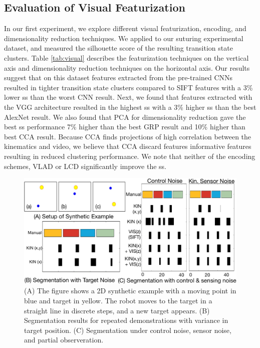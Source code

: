 \documentclass[0-main.tex]{subfiles}
\begin{document}
\subsection{Evaluation of Visual Featurization}
In our first experiment, we explore different visual featurization, encoding, and dimensionality reduction techniques.
We applied \tsc to our suturing experimental dataset, and measured the silhouette score of the resulting transition state clusters.
Table \ref{tab:visual} describes the featurization techniques on the vertical axis and dimensionality reduction techniques on the horizontal axis.
Our results suggest that on this dataset features extracted from the pre-trained CNNs resulted in tighter transition state clusters compared to SIFT features with a 3\% lower \textsf{ss} than the worst CNN result.
Next, we found that features extracted with the VGG architecture resulted in the highest \textsf{ss} with a 3\% higher \textsf{ss} than the best AlexNet result.
We also found that PCA for dimensionality reduction gave the best \textsf{ss} performance 7\% higher than the best GRP result and 10\% higher than best CCA result.
Because CCA finds projections of high correlation between the kinematics and video, we believe that CCA discard features informative features resulting in reduced clustering performance. 
We note that neither of the encoding schemes, VLAD or LCD significantly improve the \textsf{ss}.

\begin{figure}[!t]
\centering
    \includegraphics[width=\linewidth]{figures/toyEx-v3.png}
\caption{(A) The figure shows a 2D synthetic example with a moving point in blue and target in yellow. The robot moves to the target in a straight line in discrete steps, and a new target appears. 
(B) Segmentation results for repeated demonstrations with variance in target position.
(C) Segmentation under control noise, sensor noise, and partial observeration.}
\label{fig:toyEx}
\vspace{-10pt}
\end{figure}
\end{document}
